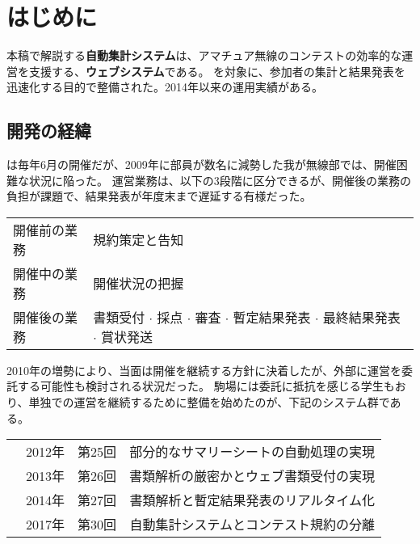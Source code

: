 \documentclass[10pt,a4paper]{book}
\begin{document}
\maketitle
\tableofcontents

\chapter{はじめに}

本稿で解説する\textbf{自動集計システム}は、アマチュア無線のコンテストの効率的な運営を支援する、\textbf{ウェブシステム}である。
\ja{}を対象に、参加者の集計と結果発表を迅速化する目的で整備された。2014年以来の運用実績がある。

\section{開発の経緯}

\ja{}は毎年6月の開催だが、2009年に部員が数名に減勢した我が無線部では、開催困難な状況に陥った。
運営業務は、以下の3段階に区分できるが、開催後の業務の負担が課題で、結果発表が年度末まで遅延する有様だった。

\begin{table}[H]
\raggedright
\begin{tabular}{Bl}
開催前の業務 & 規約策定と告知 \\
開催中の業務 & 開催状況の把握 \\
開催後の業務 & 書類受付 $\cdot$ 採点 $\cdot$ 審査 $\cdot$ 暫定結果発表 $\cdot$ 最終結果発表 $\cdot$ 賞状発送
\end{tabular}
\end{table}

2010年の増勢により、当面は開催を継続する方針に決着したが、外部に運営を委託する可能性も検討される状況だった。
駒場には委託に抵抗を感じる学生もおり、単独での運営を継続するために整備を始めたのが、下記のシステム群である。

\begin{table}[H]
\raggedright
\begin{tabular}{lllD}
 & 2012年 & 第25回 & 部分的なサマリーシートの自動処理の実現 \\
 & 2013年 & 第26回 & 書類解析の厳密かとウェブ書類受付の実現 \\
 & 2014年 & 第27回 & 書類解析と暫定結果発表のリアルタイム化 \\
 & 2017年 & 第30回 & 自動集計システムとコンテスト規約の分離 \\
\end{tabular}
\end{table}
\end{document}
